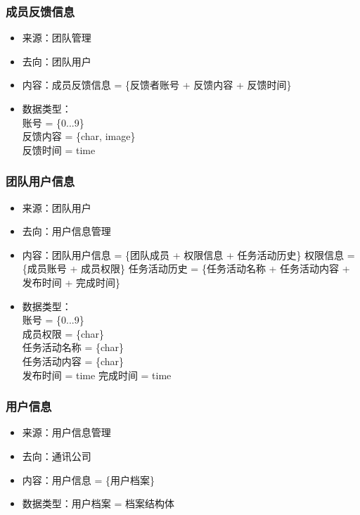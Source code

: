             \subsubsection{成员反馈信息}
            \begin{itemize}
                \item 来源：团队管理
                \item 去向：团队用户
                \item 内容：成员反馈信息 = \{反馈者账号 + 反馈内容 + 反馈时间\}
                \item 数据类型：\\
                账号 = \{0...9\} \\
                反馈内容 = \{char, image\} \\
                反馈时间 = time\\
            \end{itemize}
            \subsubsection{团队用户信息}
            \begin{itemize}
                \item 来源：团队用户
                \item 去向：用户信息管理
                \item 内容：团队用户信息 = \{团队成员 + 权限信息 + 任务活动历史\}
                     权限信息 = \{成员账号 + 成员权限\}
                     任务活动历史 = \{任务活动名称 + 任务活动内容 + 发布时间 + 完成时间\}
                \item 数据类型：\\
                账号 = \{0...9\}\\
                成员权限 = \{char\}\\
                任务活动名称 = \{char\}\\
                任务活动内容 = \{char\}\\
                发布时间 = time
                完成时间 = time
            \end{itemize}
            \subsubsection{用户信息}
            \begin{itemize}
                \item 来源：用户信息管理
                \item 去向：通讯公司
                \item 内容：用户信息 = \{用户档案\}
                \item 数据类型：用户档案 = 档案结构体
            \end{itemize}
